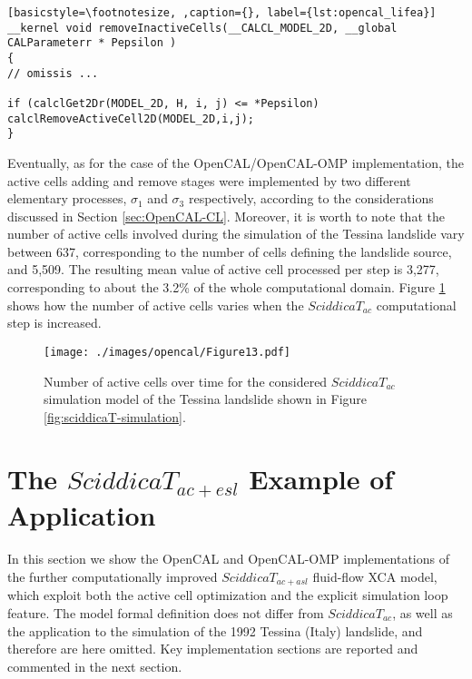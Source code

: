 \begin{lstlisting}[basicstyle=\footnotesize, ,caption={}, label={lst:opencal_lifea}]
__kernel void removeInactiveCells(__CALCL_MODEL_2D, __global CALParameterr * Pepsilon )
{
// omissis ...

if (calclGet2Dr(MODEL_2D, H, i, j) <= *Pepsilon)
calclRemoveActiveCell2D(MODEL_2D,i,j);
}
\end{lstlisting}

Eventually, as for the case of the OpenCAL/OpenCAL-OMP
implementation, the active cells adding and remove stages were
implemented by two different elementary processes, $\sigma_1$ and
$\sigma_3$ respectively, according to the considerations discussed
in Section \ref{sec:OpenCAL-CL}. Moreover, it is worth to note
that the number of active cells involved during the simulation of
the Tessina landslide vary between 637, corresponding to the
number of cells defining the landslide source, and 5,509. The
resulting mean value of active cell processed per step is 3,277,
corresponding to about the 3.2\% of the whole computational
domain. Figure \ref{gr:active_cells_count} shows how the number of
active cells varies when the $SciddicaT_{ac}$ computational step
is increased.

\begin{figure}
	\begin{center}
		\texttt{[image: ./images/opencal/Figure13.pdf]}
		\caption{Number of active cells over time for the considered $SciddicaT_{ac}$ simulation model of the Tessina landslide shown in Figure \ref{fig:sciddicaT-simulation}.}
		\label{gr:active_cells_count}
	\end{center}
\end{figure}

\section{The $SciddicaT_{ac+esl}$ Example of Application}
\label{sec:SciddicaT-ac+esl}

In this section we show the OpenCAL and OpenCAL-OMP implementations
of the further computationally improved $SciddicaT_{ac+asl}$
fluid-flow XCA model, which exploit both the active cell
optimization and the explicit simulation loop feature. The model
formal definition does not differ from $SciddicaT_{ac}$, as well as
the application to the simulation of the 1992 Tessina (Italy)
landslide, and therefore are here omitted. Key implementation
sections are reported and commented in the next section.

